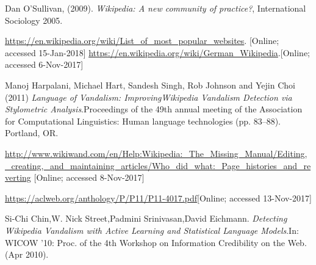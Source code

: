 \documentclass[12pt]{article}
\begin{document}
%
\begin{thebibliography}{9}

Dan O'Sullivan, (2009). 
\textit{Wikipedia: A new community of practice?}, International Sociology 2005.

\url{https://en.wikipedia.org/wiki/List_of_most_popular_websites}.
[Online; accessed 15-Jan-2018]
\url{https://en.wikipedia.org/wiki/German_Wikipedia}.[Online; accessed 6-Nov-2017]
 
 Manoj Harpalani, Michael Hart, Sandesh Singh, Rob Johnson and Yejin Choi (2011)
\textit{Language of Vandalism: ImprovingWikipedia Vandalism Detection via Stylometric Analysis}.Proceedings of the 49th annual meeting of the Association for Computational Linguistics: Human language technologies (pp. 83–88). Portland, OR.
 
\url{http://www.wikiwand.com/en/Help:Wikipedia:_The_Missing_Manual/Editing,_creating,_and_maintaining_articles/Who_did_what:_Page_histories_and_reverting}
[Online; accessed 8-Nov-2017]

\url{https://aclweb.org/anthology/P/P11/P11-4017.pdf}[Online; accessed 13-Nov-2017]

Si-Chi Chin,W. Nick Street,Padmini Srinivasan,David Eichmann.
\textit{Detecting Wikipedia Vandalism with Active Learning and Statistical Language Models}.In: WICOW ’10: Proc. of the 4th Workshop on Information Credibility on the Web. (Apr 2010).


\end{thebibliography}
\end{document}
